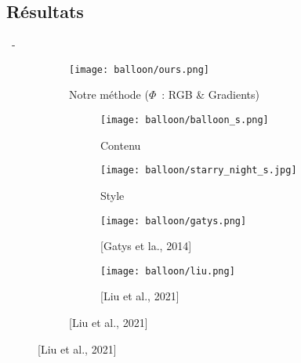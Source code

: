 \documentclass[aspectratio=169, 22pt]{beamer}
\begin{document}
\subsection{Résultats}
\begin{frame}{\secname~- \subsecname}
  \begin{figure}
    \begin{subfigure}{0.47\linewidth}
      \texttt{[image: balloon/ours.png]}
      \caption{Notre méthode ($\Phi$ : RGB \& Gradients)}
    \end{subfigure}
    \begin{subfigure}{0.45\linewidth}
      \begin{subfigure}{0.45\linewidth}
        \texttt{[image: balloon/balloon\_s.png]}
        \caption{Contenu}
      \end{subfigure}
      \begin{subfigure}{0.45\linewidth}
        \texttt{[image: balloon/starry\_night\_s.jpg]}
        \caption{Style}
      \end{subfigure}

      \begin{subfigure}{0.45\linewidth}
        \texttt{[image: balloon/gatys.png]}
        \caption{[Gatys et la., 2014]}
      \end{subfigure}
      \begin{subfigure}{0.45\linewidth}
        \texttt{[image: balloon/liu.png]}
        \caption{[Liu et al., 2021]}
      \end{subfigure}
    \end{subfigure}
  \end{figure}
\end{frame}
\end{document}
